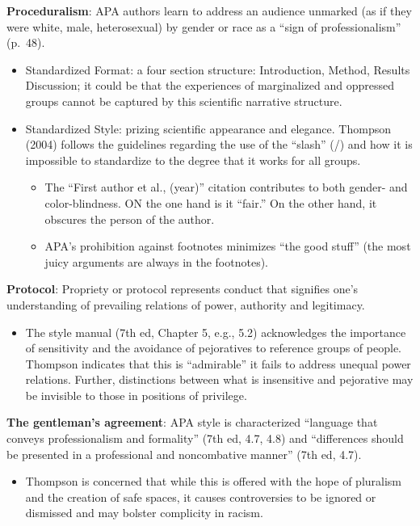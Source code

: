 \documentclass[
  11pt,
]{book}
\providecommand{\tightlist}{%
  \setlength{\itemsep}{0pt}\setlength{\parskip}{0pt}}
\begin{document}
\textbf{Proceduralism}: APA authors learn to address an audience unmarked (as if they were white, male, heterosexual) by gender or race as a ``sign of professionalism'' (p.~48).

\begin{itemize}
\tightlist
\item
  Standardized Format: a four section structure: Introduction, Method, Results Discussion; it could be that the experiences of marginalized and oppressed groups cannot be captured by this scientific narrative structure.
\item
  Standardized Style: prizing scientific appearance and elegance. Thompson (2004) follows the guidelines regarding the use of the ``slash'' (/) and how it is impossible to standardize to the degree that it works for all groups.

  \begin{itemize}
  \tightlist
  \item
    The ``First author et al., (year)'' citation contributes to both gender- and color-blindness. ON the one hand is it ``fair.'' On the other hand, it obscures the person of the author.
  \item
    APA's prohibition against footnotes minimizes ``the good stuff'' (the most juicy arguments are always in the footnotes).
  \end{itemize}
\end{itemize}

\textbf{Protocol}: Propriety or protocol represents conduct that signifies one's understanding of prevailing relations of power, authority and legitimacy.

\begin{itemize}
\tightlist
\item
  The style manual (7th ed, Chapter 5, e.g., 5.2) acknowledges the importance of sensitivity and the avoidance of pejoratives to reference groups of people. Thompson indicates that this is ``admirable'' it fails to address unequal power relations. Further, distinctions between what is insensitive and pejorative may be invisible to those in positions of privilege.
\end{itemize}

\textbf{The gentleman's agreement}: APA style is characterized ``language that conveys professionalism and formality'' (7th ed, 4.7, 4.8) and ``differences should be presented in a professional and noncombative manner'' (7th ed, 4.7).

\begin{itemize}
\tightlist
\item
  Thompson \citeyearpar{thompson_gentlemanly_2004} is concerned that while this is offered with the hope of pluralism and the creation of safe spaces, it causes controversies to be ignored or dismissed and may bolster complicity in racism.
\end{itemize}
\end{document}
